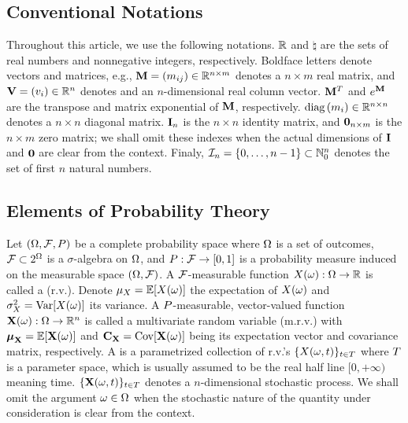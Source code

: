 \subsection{Conventional Notations}
Throughout this article, we use the following notations. $\mathbb{R}$ and $\natural$ are the sets of real numbers and nonnegative integers, respectively. Boldface letters denote vectors and matrices, e.g., $\m{M} = \mtx{m_{ij}} \in \real^{n \times m}$ denotes a $n \times m$ real matrix, and $\mathbf{V} = (v_i) \in \mathbb{R}^n$ denotes and an $n$-dimensional real column vector. $\m{M}^T$ and $e^\m{M}$ are the transpose and matrix exponential of $\m{M}$, respectively. $\text{diag}\left(m_i\right) \in \mathbb{R}^{n \times n}$ denotes a $n \times n$ diagonal matrix. $\mI_n$ is the $n \times n$ identity matrix, and $\mZ_{n \times m}$ is the $n \times m$ zero matrix; we shall omit these indexes when the actual dimensions of $\mI$ and $\mZ$ are clear from the context. Finaly, $\mathcal{I}_n = \{ 0, \dots, n - 1 \} \subset \mathbb{N}_0^n$ denotes the set of first $n$ natural numbers.

\subsection{Elements of Probability Theory}
Let $(\Omega, \mathcal{F}, P)$ be a complete probability space \cite{durrett2010} where $\Omega$ is a set of outcomes, $\mathcal{F} \subset 2^\Omega$ is a $\sigma$-algebra on $\Omega$, and $P: \mathcal{F} \to [0, 1]$ is a probability measure induced on the measurable space $(\Omega, \mathcal{F})$. A $\mathcal{F}$-measurable function $\rv{x}(\o): \outcomes \to \real$ is called a  (r.v.). Denote $\exp_\rv{x} = \oExp{\rv{x}(\o)}$ the expectation of $\rv{x}(\o)$ and $\var_\rv{x} = \oVar{\rv{x}(\o)}$ its variance. A $P$-measurable, vector-valued function $\mrv{x}(\o): \outcomes \to \real^n$ is called a multivariate random variable (m.r.v.) with $\vExp_\mrv{x} = \oExp{\mrv{x}(\o)}$ and $\mCov_\mrv{x} = \oCov{\mrv{x}(\o)}$ being its expectation vector and covariance matrix, respectively. A  is a parametrized collection of r.v.'s $\{ \rv{x}(\o, \t) \}_{\t \in \sTime}$ where $T$ is a parameter space, which is usually assumed to be the real half line $[0, +\infty)$ meaning time. $\{ \mrv{x}(\o, \t) \}_{\t \in \sTime}$ denotes a $n$-dimensional stochastic process. We shall omit the argument $\omega \in \Omega$ when the stochastic nature of the quantity under consideration is clear from the context.

